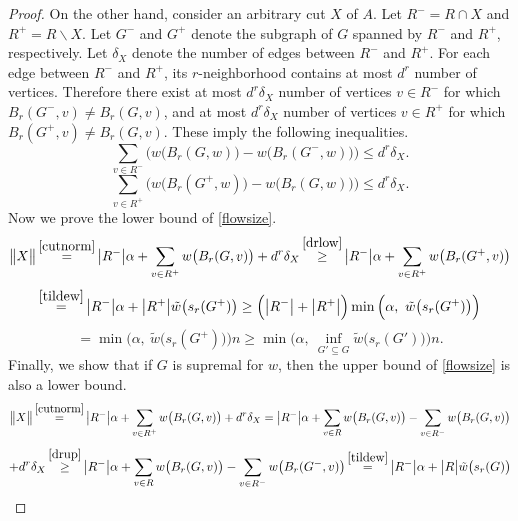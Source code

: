 \documentclass[12pt,a4paper]{article}
\renewcommand{\:}{\colon}
\begin{document}
\begin{proof}
On the other hand, consider an arbitrary cut $X$ of $A$. 
Let $R^- = R \cap X$ and $R^+ = R \backslash X$. 
Let $G^-$ and $G^+$ denote the subgraph of $G$ spanned by $R^-$ and $R^+$, respectively. 
Let $\delta_X$ denote the number of edges between $R^-$ and $R^+$. 
For each edge between $R^-$ and $R^+$, its $r$-neighborhood contains at most $d^r$ number of vertices. 
Therefore there exist at most $d^r \delta_X$ number of vertices $v \in R^-$ for which $B_r(G^-, v) \ne B_r(G, v)$, and at most $d^r \delta_X$ number of vertices $v \in R^+$ for which $B_r(G^+, v) \ne B_r(G, v)$. 
These imply the following inequalities.
\begin{equation} \label{drup}
\sum_{v \in R^-} \Big( w\big(B_r(G, w)\big) - w\big(B_r(G^-, w)\big) \Big) \le d^r \delta_X.
\end{equation}
\begin{equation} \label{drlow}
\sum_{v \in R^+} \Big( w\big(B_r(G^+, w)\big) - w\big(B_r(G, w)\big) \Big) \le d^r \delta_X.
\end{equation}
Now we prove the lower bound of \eqref{flowsize}.
\begin{equation*}
\big\|X\big\| \mathop{=}^{\eqref{cutnorm}} \big|R^-\big| \alpha + \sum_{v \in R^+} w\big(B_r(G, v)\big) +  d ^ r \delta_X \mathop{\ge}^{\eqref{drlow}} \big|R^-\big| \alpha + \sum_{v \in R^+} w\big(B_r(G^+, v)\big)
\end{equation*}
\begin{equation*}
\mathop{=}^{\eqref{tildew}} \big|R^-\big| \alpha + \big|R^+\big| \tilde{w}\big(s_r(G^+)\big) \ge \Big(\big|R^-\big| + \big|R^+\big|\Big) \min\Big(\alpha,\ \tilde{w}\big(s_r(G^+)\big)\Big)
\end{equation*}
\begin{equation*}
= \min\Big(\alpha,\  \tilde{w}\big(s_r(G^+)\big)\Big) n \ge
\min\Big(\alpha,\ \inf_{G' \subseteq G} \tilde{w}\big(s_r(G')\big)\Big) n.
\end{equation*}
Finally, we show that if $G$ is supremal for $w$, then the upper bound of \eqref{flowsize} is also a lower bound.
\begin{equation*}
\big\|X\big\| \mathop{=}^{\eqref{cutnorm}} \big|R^-\big| \alpha + \sum_{v \in R^+} w\big(B_r(G, v)\big) +  d ^ r \delta_X
= \big|R^-\big| \alpha + \sum_{v \in R} w\big(B_r(G, v)\big) - \sum_{v \in R^-} w\big(B_r(G, v)\big)
\end{equation*}
\begin{equation*}
+ d ^ r \delta_X \mathop{\ge}^{\eqref{drup}} \big|R^-\big| \alpha + \sum_{v \in R} w\big(B_r(G, v)\big) - \sum_{v \in R^-} w\big(B_r(G^-, v)\big) \mathop{=}^{\eqref{tildew}} \big|R^-\big| \alpha + \big|R\big| \tilde{w}\big(s_r(G)\big)

\end{equation*}
\end{proof}
\end{document}
